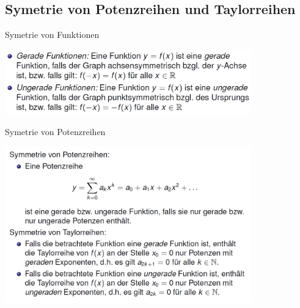 \subsection{Symetrie von Potenzreihen und Taylorreihen}
\begin{lemma}{Symetrie von Funktionen}\\
  \begin{centering}
    \includegraphics[width=0.8\textwidth]{images/2024-06-02-19-25-55.png}\\
  \end{centering} 
\end{lemma}
\begin{lemma}{Symetrie von Potenzreihen}\\
  \begin{centering}
  \includegraphics[width=0.8\textwidth]{images/2024-06-02-19-28-18.png}\\
  \end{centering}
\end{lemma}
